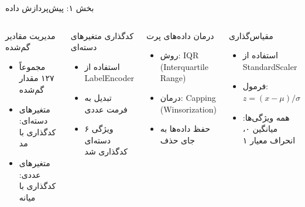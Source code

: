 \documentclass[aspectratio=169]{beamer}
\begin{document}
\begin{frame}{بخش ۱: پیش‌پردازش داده}
\begin{columns}
\begin{block}{مدیریت مقادیر گم‌شده}
\begin{itemize}
\item مجموعاً ۱۲۷ مقدار گم‌شده
\item متغیرهای دسته‌ای: کدگذاری با مد
\item متغیرهای عددی: کدگذاری با میانه
\end{itemize}
\end{block}

\begin{block}{کدگذاری متغیرهای دسته‌ای}
\begin{itemize}
\item استفاده از LabelEncoder
\item تبدیل به فرمت عددی
\item ۶ ویژگی دسته‌ای کدگذاری شد
\end{itemize}
\end{block}

\begin{block}{درمان داده‌های پرت}
\begin{itemize}
\item روش: IQR (Interquartile Range)
\item درمان: Capping (Winsorization)
\item حفظ داده‌ها به جای حذف
\end{itemize}
\end{block}

\begin{block}{مقیاس‌گذاری}
\begin{itemize}
\item استفاده از StandardScaler
\item فرمول: $z = (x - \mu) / \sigma$
\item همه ویژگی‌ها: میانگین ۰، انحراف معیار ۱
\end{itemize}
\end{block}
\end{columns}
\end{frame}
\end{document}

